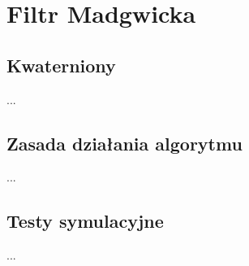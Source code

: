 \section{Filtr Madgwicka}

\cite{Madgwick2010AnEO}

\subsection{Kwaterniony}
...

\subsection{Zasada działania algorytmu}
...

\subsection{Testy symulacyjne}
...
